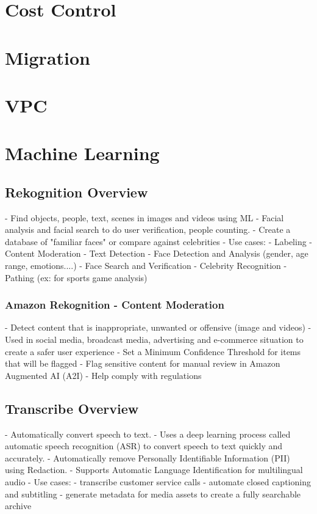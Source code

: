 \documentclass[11pt]{article}
\begin{document}
    \chapter{Cost Control}
    \chapter{Migration}
    \chapter{VPC}
    \chapter{Machine Learning}
    \section{Rekognition Overview}
    - Find objects, people, text, scenes in images and videos using ML
    - Facial analysis and facial search to do user verification, people counting.
    - Create a database of "familiar faces" or compare against celebrities
    - Use cases:
        - Labeling
        - Content Moderation
        - Text Detection
        - Face Detection and Analysis (gender, age range, emotions....)
        - Face Search and Verification
        - Celebrity Recognition
        - Pathing (ex: for sports game analysis)

    \subsection{Amazon Rekognition - Content Moderation}
    - Detect content that is inappropriate, unwanted or offensive (image and videos)
    - Used in social media, broadcast media, advertising and e-commerce situation to create a safer user experience
    - Set a Minimum Confidence Threshold for items that will be flagged
    - Flag sensitive content for manual review in Amazon Augmented AI (A2I)
    - Help comply with regulations

    \section{Transcribe Overview}
    - Automatically convert speech to text.
    - Uses a deep learning process called automatic speech recognition (ASR) to convert speech to text quickly and accurately.
    - Automatically remove Personally Identifiable Information (PII) using Redaction.
    - Supports Automatic Language Identification for multilingual audio
    - Use cases:
        - transcribe customer service calls
        - automate closed captioning and subtitling
        - generate metadata for media assets to create a fully searchable archive
\end{document}
